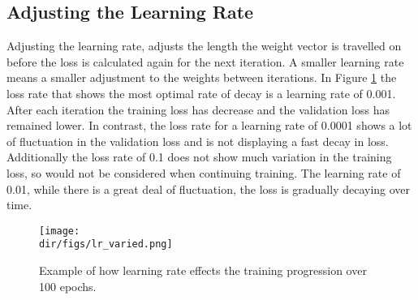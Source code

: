 \subsection{Adjusting the Learning Rate}
Adjusting the learning rate, adjusts the length the weight vector is travelled on before the loss is calculated again for the next iteration. A smaller learning rate means a smaller adjustment to the weights between iterations. In Figure \ref{fig.lr_varied} the loss rate that shows the most optimal rate of decay is a learning rate of 0.001. After each iteration the training loss has decrease and the validation loss has remained lower. In contrast, the loss rate for a learning rate of 0.0001 shows a lot of fluctuation in the validation loss and is not displaying a fast decay in loss. Additionally the loss rate of 0.1 does not show much variation in the training loss, so would not be considered when continuing training. The learning rate of 0.01, while there is a great deal of fluctuation, the loss is gradually decaying over time. 
\begin{figure}[htpb]
    \centering
    \texttt{[image: \\dir/figs/lr\_varied.png]}
    \caption[Example of the effect of changing the learning rate]{Example of how learning rate effects the training progression over 100 epochs.}
    \label{fig.lr_varied}
\end{figure}

